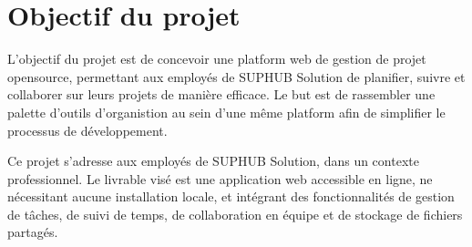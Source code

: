 \section{Objectif du projet}

L’objectif du projet est de concevoir une platform web de gestion de projet opensource, permettant aux employés de SUPHUB Solution de planifier, suivre et collaborer sur leurs projets de manière efficace. 
Le but est de rassembler une palette d'outils d'organistion au sein d'une même platform afin de simplifier le processus de développement.

Ce projet s'adresse aux employés de SUPHUB Solution, dans un contexte professionnel.
Le livrable visé est une application web accessible en ligne, ne nécessitant aucune installation locale, et intégrant des fonctionnalités de gestion de tâches, de suivi de temps, de collaboration en équipe et de stockage de fichiers partagés.

